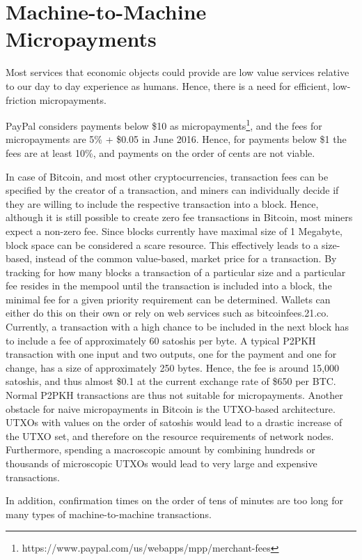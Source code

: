 \chapter{Machine-to-Machine Micropayments}

Most services that economic objects could provide are low value services relative to our day to day experience as humans. Hence, there is a need for efficient, low-friction micropayments. 

PayPal considers payments below \$10 as micropayments\footnote{https://www.paypal.com/us/webapps/mpp/merchant-fees}, and the fees for micropayments are 5\% + \$0.05 in June 2016. Hence, for payments below \$1 the fees are at least 10\%, and payments on the order of cents are not viable. 

In case of Bitcoin, and most other cryptocurrencies, transaction fees can be specified by the creator of a transaction, and miners can individually decide if they are willing to include the respective transaction into a block. Hence, although it is still possible to create zero fee transactions in Bitcoin, most miners expect a non-zero fee. Since blocks currently have maximal size of 1 Megabyte, block space can be considered a scare resource. This effectively leads to a size-based, instead of the common value-based, market price for a transaction. By tracking for how many blocks a transaction of a particular size and a particular fee resides in the mempool until the transaction is included into a block, the minimal fee for a given priority requirement can be determined. Wallets can either do this on their own or rely on web services such as bitcoinfees.21.co. 
Currently, a transaction with a high chance to be included in the next block has to include a fee of approximately 60 satoshis per byte. A typical P2PKH transaction with one input and two outputs, one for the payment and one for change, has a size of approximately 250 bytes. Hence, the fee is around 15,000 satoshis, and thus almost \$0.1 at the current exchange rate of \$650 per BTC. 
Normal P2PKH transactions are thus not suitable for micropayments. Another obstacle for naive micropayments in Bitcoin is the UTXO-based architecture. UTXOs with values on the order of satoshis would lead to a drastic increase of the UTXO set, and therefore on the resource requirements of network nodes. Furthermore, spending a macroscopic amount by combining hundreds or thousands of microscopic UTXOs would lead to very large and expensive transactions. 

In addition, confirmation times on the order of tens of minutes are too long for many types of  machine-to-machine transactions.

